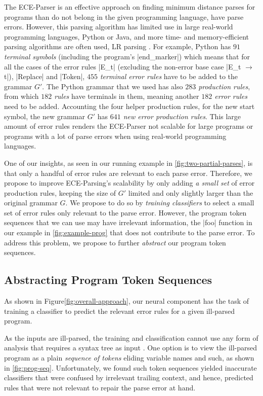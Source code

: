 The ECE-Parser is an effective approach on finding minimum distance parses for
programs than do not belong in the given programming language, \ie have parse
errors. However, this parsing algorithm has limited use in large real-world
programming languages, \eg Python or Java, and more time- and memory-efficient
parsing algorithms are often used, \eg LR parsing \etc \citep{Knuth_1965,
Chapman_1987}. For example, Python has \emph{$91$ terminal symbols} (including
the program's |end_marker|) which means that for all the cases of the error
rules |E_t| (excluding the non-error base case |E_t $\rightarrow$ t|), |Replace|
and |Token|, \emph{$455$ terminal error rules} have to be added to the grammar
$G'$. The Python grammar that we used has also \emph{$283$ production rules},
from which \emph{$182$ rules} have terminals in them, meaning another
\emph{$182$ error rules} need to be added. Accounting the four helper production
rules, \eg for the new start symbol, the new grammar $G'$ has \emph{$641$ new
error production rules}. This large amount of error rules renders the ECE-Parser
not scalable for large programs or programs with a lot of parse errors when
using real-world programming languages.

One of our insights,
as seen in our running example in \autoref{fig:two-partial-parses}, is that only
a handful of error rules are relevant to each parse error. Therefore, we
propose to improve ECE-Parsing's scalability by only adding \emph{a
small set} of error production rules, \ie keeping the size of $G'$ limited and
only slightly larger than the original grammar $G$. We propose to do so by
\emph{training classifiers} to select a small set of error rules only relevant
to the parse error. However, the program token sequences that we can use
may have irrelevant information, \eg the |foo| function in our example in
\autoref{fig:example-prog} that does not contribute to the parse error. To
address this problem, we propose to further \emph{abstract} our program token
sequences.

\subsection{Abstracting Program Token Sequences}
\label{sec:overview:abstraction}

As shown in Figure\ref{fig:overall-approach}, our neural component
has the task of training a classifier to predict the relevant error
rules for a given ill-parsed program.

%
As the inputs are ill-parsed, the training and classification
cannot use any form of analysis that requires a syntax tree as
input \citep{Sakkas_2020, Martinez_2013, Gulwani_2018, Wang_2018}.
%
One option is to view the ill-parsed program as a
plain \emph{sequence of tokens} eliding variable
names and such, as shown in \autoref{fig:prog-seq}.
%
Unfortunately, we found such token sequences yielded inaccurate
classifiers that were confused by irrelevant trailing
context, and hence, predicted rules that were not relevant
to repair the parse error at hand.


